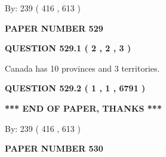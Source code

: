 \documentclass[12pt]{article}
\begin{document}
   
\hspace{1.0in} By: 
 239 ( 416 ,  613 )
   
   
   
   
\newpage 
\setcounter{page}{ 
   529001 } 
   
   
   
   
 {\textbf{ \Large{ PAPER NUMBER  529  }}}
   
   
\vspace{0.2in}
   
   
   
   
   
   
 \vspace{0.2in}
 
 
 
 
   
   
  
\vspace{0.2in}
  
{\textbf{\Large{QUESTION
529.1 
 ( 2 , 2 , 3 )
}}}
  
  
 
 
\noindent{}
 
 
Canada has 10  provinces and 3 territories.
 
 
 
 
  
\vspace{0.2in}
  
{\textbf{\Large{QUESTION
529.2 
 ( 1 , 1 , 6791 )
}}}
  
  
   
   
 \vspace{0.2in}
 
   
   
   
   
\vspace{1.0in} 
{\textbf{\large{ *** END OF PAPER, THANKS *** }}} 
   
   
\hspace{1.0in} By: 
 239 ( 416 ,  613 )
   
   
   
   
\newpage 
\setcounter{page}{ 
   530001 } 
   
   
   
   
 {\textbf{ \Large{ PAPER NUMBER  530  }}}
   
\end{document}
